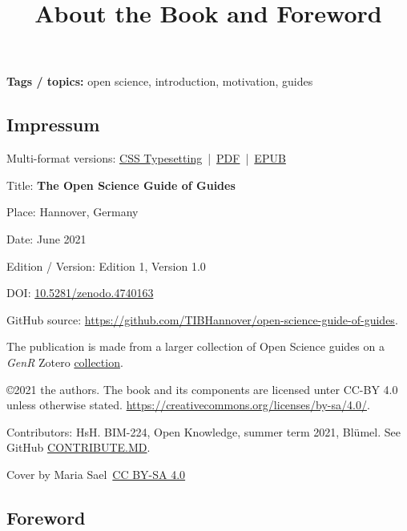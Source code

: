 \documentclass{article}
\begin{document}
\title{About the Book and Foreword}

\maketitle


\textbf{Tags / topics:} open science, introduction, motivation, guides


\subsection{Impressum}\label{H8810070}



Multi-format versions: \href{https://vivliostyle.vercel.app/#src=https://tibhannover.github.io/open-science-guide-of-guides/html/index.html&bookMode=true}{CSS Typesetting} | \href{https://tibhannover.github.io/open-science-guide-of-guides/pdf/book.pdf}{PDF} | \href{https://tibhannover.github.io/open-science-guide-of-guides/book.epub}{EPUB}  


Title: \textbf{The Open Science Guide of Guides}


Place: Hannover, Germany


Date: June 2021


Edition / Version: Edition 1, Version 1.0


DOI: \href{https://doi.org/10.5281/zenodo.4740163}{10.5281/zenodo.4740163}


GitHub source: \href{https://github.com/TIBHannover/open-science-guide-of-guides}{https://github.com/TIBHannover/open-science-guide-of-guides}. 


The publication is made from a larger collection of Open Science guides on a \emph{GenR} Zotero \href{https://www.zotero.org/groups/1838445/generation_r/collections/DND4FSHT}{collection}.


©2021 the authors. The book and its components are licensed unter CC-BY 4.0 unless otherwise stated. \href{https://creativecommons.org/licenses/by-sa/4.0/}{https://creativecommons.org/licenses/by-sa/4.0/}. 


Contributors: HsH. BIM-224, Open Knowledge, summer term 2021, Blümel. See GitHub \href{https://github.com/TIBHannover/open-science-guide-of-guides/blob/main/CONTRIBUTE.MD}{CONTRIBUTE.MD}. 


Cover by Maria Sael \href{https://creativecommons.org/licenses/by-sa/4.0/}{CC BY-SA 4.0}


\subsection{Foreword}\label{H592737}
\end{document}
